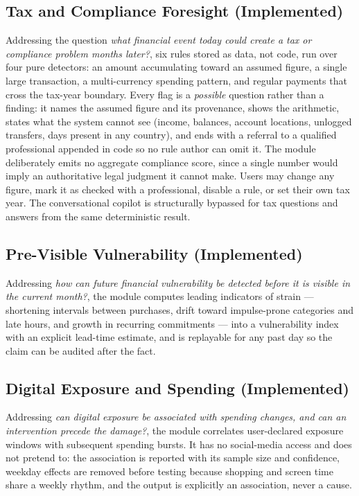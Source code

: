 \documentclass[conference]{IEEEtran}
\begin{document}
\subsection{Tax and Compliance Foresight (Implemented)}

Addressing the question \emph{what financial event today could create a tax or compliance problem months later?}, six rules stored as data, not code, run over four pure detectors: an amount accumulating toward an assumed figure, a single large transaction, a multi-currency spending pattern, and regular payments that cross the tax-year boundary. Every flag is a \emph{possible} question rather than a finding: it names the assumed figure and its provenance, shows the arithmetic, states what the system cannot see (income, balances, account locations, unlogged transfers, days present in any country), and ends with a referral to a qualified professional appended in code so no rule author can omit it. The module deliberately emits no aggregate compliance score, since a single number would imply an authoritative legal judgment it cannot make. Users may change any figure, mark it as checked with a professional, disable a rule, or set their own tax year. The conversational copilot is structurally bypassed for tax questions and answers from the same deterministic result.

\subsection{Pre-Visible Vulnerability (Implemented)}

Addressing \emph{how can future financial vulnerability be detected before it is visible in the current month?}, the module computes leading indicators of strain --- shortening intervals between purchases, drift toward impulse-prone categories and late hours, and growth in recurring commitments --- into a vulnerability index with an explicit lead-time estimate, and is replayable for any past day so the claim can be audited after the fact.

\subsection{Digital Exposure and Spending (Implemented)}

Addressing \emph{can digital exposure be associated with spending changes, and can an intervention precede the damage?}, the module correlates user-declared exposure windows with subsequent spending bursts. It has no social-media access and does not pretend to: the association is reported with its sample size and confidence, weekday effects are removed before testing because shopping and screen time share a weekly rhythm, and the output is explicitly an association, never a cause.
\end{document}
